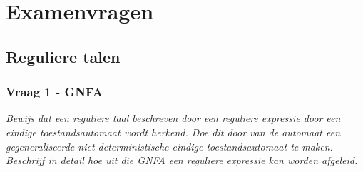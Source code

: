 \section{Examenvragen}

\subsection{Reguliere talen}

\subsubsection{Vraag 1 - GNFA}

\textit{Bewijs dat een reguliere taal beschreven door een reguliere expressie door een eindige toestandsautomaat wordt herkend. Doe dit door van de automaat een gegeneraliseerde niet-deterministische eindige toestandsautomaat te maken. Beschrijf in detail hoe uit die GNFA een reguliere expressie kan worden afgeleid.}

